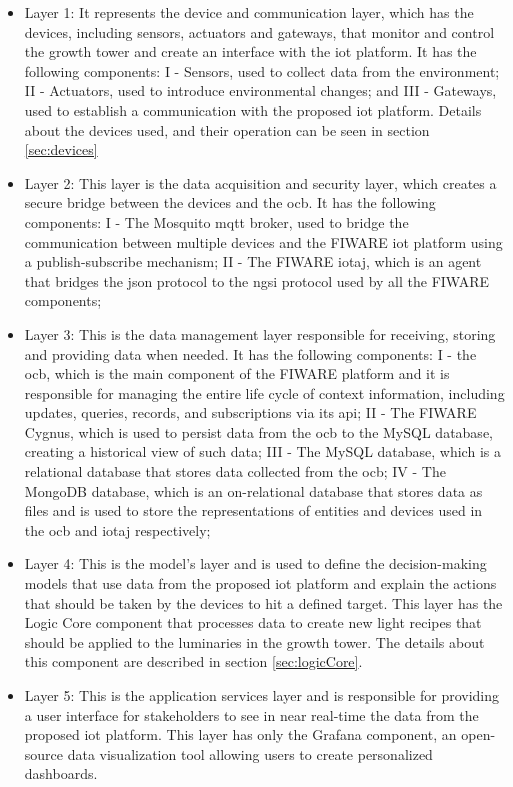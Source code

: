 \documentclass[preprint, review, 12pt]{elsarticle}
\begin{document}
\begin{itemize}
    \item Layer 1: It represents the device and communication layer, which has the devices, including sensors, actuators and gateways, that monitor and control the growth tower and create an interface with the \gls{iot} platform. It has the following components: I - Sensors, used to collect data from the environment; II - Actuators, used to introduce environmental changes; and III - Gateways, used to establish a communication with the proposed \gls{iot} platform. Details about the devices used, and their operation can be seen in section \ref{sec:devices}

    \item Layer 2: This layer is the data acquisition and security layer, which creates a secure bridge between the devices and the \gls{ocb}. It has the following components: I - The Mosquito \gls{mqtt} broker, used to bridge the communication between multiple devices and the FIWARE \gls{iot} platform using a publish-subscribe mechanism; II - The FIWARE \gls{iotaj}, which is an agent that bridges the \gls{json} protocol to the \gls{ngsi} protocol used by all the FIWARE components;

    \item Layer 3: This is the data management layer responsible for receiving, storing and providing data when needed. It has the following components: I - the \gls{ocb}, which is the main component of the FIWARE platform and it is responsible for managing the entire life cycle of context information, including updates, queries, records, and subscriptions via its \gls{api}; II - The FIWARE Cygnus, which is used to persist data from the \gls{ocb} to the MySQL database, creating a historical view of such data; III - The MySQL database, which is a relational database that stores data collected from the \gls{ocb}; IV - The MongoDB database, which is an on-relational database that stores data as files and is used to store the representations of entities and devices used in the \gls{ocb} and \gls{iotaj} respectively; 

    \item Layer 4: This is the model's layer and is used to define the decision-making models that use data from the proposed \gls{iot} platform and explain the actions that should be taken by the devices to hit a defined target. This layer has the Logic Core component that processes data to create new light recipes that should be applied to the luminaries in the growth tower. The details about this component are described in section \ref{sec:logicCore}.

    \item Layer 5: This is the application services layer and is responsible for providing a user interface for stakeholders to see in near real-time the data from the proposed \gls{iot} platform. This layer has only the Grafana component, an open-source data visualization tool allowing users to create personalized dashboards.  
\end{itemize}
\end{document}
